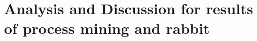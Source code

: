 \chapter{Analysis and Discussion for results of process mining and rabbit}\label{Processor extensions}
